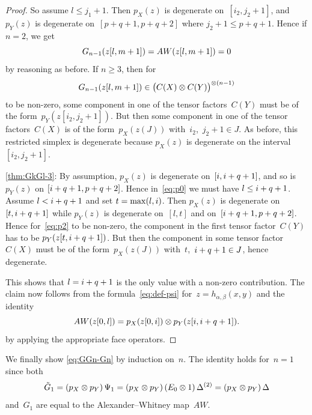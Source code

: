\documentclass[letterpaper]{amsart}
\numberwithin{equation}{section}
\theoremstyle{plain}
\theoremstyle{definition}
\theoremstyle{remark}
\def\AW{AW}
\def\restr#1#2#3{#1[#2,#3]}
\begin{document}
\begin{proof}
  So assume $l\le j_{1}+1$. Then $p_{X}(z)$ is degenerate on~$[i_{2},j_{2}+1]$,
  and $p_{Y}(z)$ is degenerate on~$[p+q+1,p+q+2]$ where $j_{2}+1\le p+q+1$.
  Hence if $n=2$, we get
  \begin{equation}
    G_{n-1}(\restr{z}{l}{\n+1}) = \AW(\restr{z}{l}{\n+1}) = 0
  \end{equation}
  by reasoning as before. If $n\ge3$, then for
  \begin{equation}
    \label{eq:p2}
    G_{n-1}(\restr{z}{l}{\n+1}) \in \bigl(C(X)\otimes C(Y)\bigr)^{\otimes(n-1)}
  \end{equation}
  to be non-zero, some component in one of the tensor factors~$C(Y)$
  must be of the form~$p_{Y}(\restr{z}{i_{2}}{j_{2}+1})$. But then some component in one of the tensor factors~$C(X)$
  is of the form~$p_{X}(z(J))$ with~$i_{2}$,~$j_{2}+1\in J$.
  As before, this restricted simplex is degenerate
  because $p_{X}(z)$ is degenerate on the interval~$[i_{2},j_{2}+1]$.

  \ref{thm:GkGl-3}:
  By assumption, $p_{X}(z)$ is degenerate on~$[i,i+q+1]$, and
  so is $p_{Y}(z)$ on $[i+q+1,p+q+2]$. %
  Hence in~\eqref{eq:p0} we must have $l\le i+q+1$.
  Assume $l<i+q+1$ and set $t=\max(l,i)$. Then $p_{X}(z)$ is degenerate on~$[t,i+q+1]$ while
  $p_{Y}(z)$ is degenerate on~$[l,t]$ %
  and on~$[i+q+1,p+q+2]$. Hence for~\eqref{eq:p2}
  to be non-zero, the component in the first tensor factor~$C(Y)$ has to be $p_{Y}(\restr{z}{t}{\si+q+1})$.
  But then the component in some tensor factor~$C(X)$ must be
  of the form~$p_{X}(z(J))$ with~$t$,~$i+q+1\in J$, hence degenerate.

  This shows that $l=i+q+1$ is the only value with a non-zero contribution.
  The claim now follows from the formula~\eqref{eq:def-psi} for~$z=h_{\alpha,\beta}(x,y)$ and the identity
  \begin{equation}
    \AW(\restr{z}{0}{l}) = p_{X}(\restr{z}{0}{\si}) \otimes p_{Y}(\restr{z}{\si}{\si+q+1}).
  \end{equation}
  by applying the appropriate face operators.
\end{proof}

We finally show \eqref{eq:GGn-Gn}
by induction on~$n$. The identity holds for~$n=1$ since both
\begin{equation}
  \tilde G_{1} = (p_{X}\otimes p_{Y})\,\Psi_{1} = (p_{X}\otimes p_{Y})\,(E_{0}\otimes 1)\,\Delta^{(2)} = (p_{X}\otimes p_{Y})\,\Delta
\end{equation}
and~$G_{1}$ are equal to the Alexander--Whitney map~$\AW$.
\end{document}
